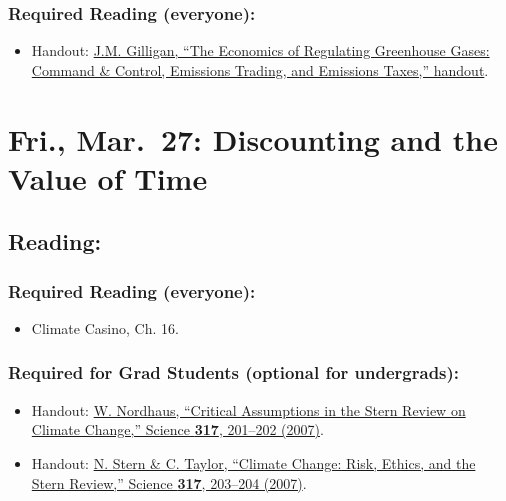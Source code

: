 \documentclass[
]{article}
\providecommand{\tightlist}{%
  \setlength{\itemsep}{0pt}\setlength{\parskip}{0pt}}
\begin{document}
\hypertarget{required-reading-everyone-25}{%
\subsubsection{Required Reading
(everyone):}\label{required-reading-everyone-25}}

\begin{itemize}
\tightlist
\item
  Handout:
  \href{/files/reading_handouts/Economics_of_Regulating_Greenhouse_Gases.pdf}{J.M.
  Gilligan, ``The Economics of Regulating Greenhouse Gases: Command \&
  Control, Emissions Trading, and Emissions Taxes,'' handout}.
\end{itemize}

\hypertarget{fri.-mar.-27-discounting-and-the-value-of-time}{%
\section{Fri., Mar.~27: Discounting and the Value of
Time}\label{fri.-mar.-27-discounting-and-the-value-of-time}}

\hypertarget{reading-31}{%
\subsection{Reading:}\label{reading-31}}

\hypertarget{required-reading-everyone-26}{%
\subsubsection{Required Reading
(everyone):}\label{required-reading-everyone-26}}

\begin{itemize}
\tightlist
\item
  Climate Casino, Ch. 16.
\end{itemize}

\hypertarget{required-for-grad-students-optional-for-undergrads}{%
\subsubsection{Required for Grad Students (optional for
undergrads):}\label{required-for-grad-students-optional-for-undergrads}}

\begin{itemize}
\tightlist
\item
  Handout:
  \href{http://www.econ.yale.edu/~nordhaus/homepage/homepage/nordhaus_stern_science.pdf}{W.
  Nordhaus, ``Critical Assumptions in the Stern Review on Climate
  Change,'' Science \textbf{317}, 201--202 (2007)}.
\item
  Handout:
  \href{http://science.sciencemag.org.proxy.library.vanderbilt.edu/content/317/5835/203.long}{N.
  Stern \& C. Taylor, ``Climate Change: Risk, Ethics, and the Stern
  Review,'' Science \textbf{317}, 203--204 (2007)}.
\end{itemize}
\end{document}
